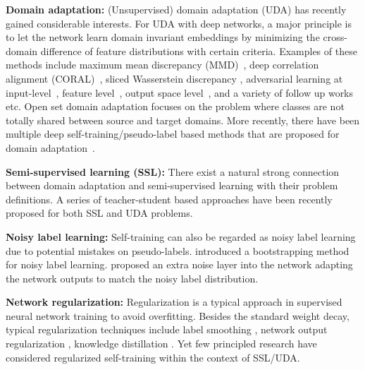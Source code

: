 \documentclass[10pt,twocolumn,letterpaper]{article}
\theoremstyle{plain}
\begin{document}
\noindent\textbf{Domain adaptation: } (Unsupervised) domain adaptation (UDA) has recently gained considerable interests. For UDA with deep networks, a major principle is to let the network learn domain invariant embeddings by minimizing the cross-domain difference of feature distributions with certain criteria. Examples of these methods include maximum mean discrepancy (MMD)~\cite{long2015learning,tzeng2014deep}, deep correlation alignment (CORAL)~\cite{sun2016deep}, sliced Wasserstein discrepancy \cite{lee2019sliced}, adversarial learning at input-level~\cite{hoffman2018cycada,gong2019dlow,dundar2020domain}, feature level~\cite{chen2019learning, ganin2015unsupervised,hoffman2018cycada,liu2019feature,saito2018adversarial,tzeng2017adversarial,wu2018dcan}, output space level~\cite{Tsai_adaptseg_2018}, and a variety of follow up works~\cite{chen2017no,long2018conditional,pinheiro2018unsupervised,sankaranarayanan2018generate} etc. Open set domain adaptation \cite{panareda2017open,saito2018open} focuses on the problem where classes are not totally shared between source and target domains. More recently, there have been multiple deep self-training/pseudo-label based methods that are proposed for domain adaptation~\cite{busto2018open,han2019unsupervised,inoue2018cross,saito2017asymmetric,shu2018dirt,Zou_2018_ECCV}.

\noindent\textbf{Semi-supervised learning (SSL): }There exist a natural strong connection between domain adaptation and semi-supervised learning with their problem definitions. A series of teacher-student based approaches have been recently proposed for both SSL \cite{laine2016temporal, tarvainen2017mean,luo2018smooth} and UDA problems\cite{french2018self}.

\noindent\textbf{Noisy label learning: }
Self-training can also be regarded as noisy label learning \cite{natarajan2013learning,reed2015training,sukhbaatar2014learning,yu2018seal} due to potential mistakes on pseudo-labels. \cite{reed2015training} introduced a bootstrapping method for noisy label learning. \cite{sukhbaatar2014learning} proposed an extra noise layer into the network adapting the network outputs to match the noisy label distribution.

\noindent\textbf{Network regularization: }
Regularization is a typical approach in supervised neural network training to avoid overfitting. Besides the standard weight decay, typical regularization techniques include label smoothing \cite{Goodfellow-et-al-2016,szegedy2016rethinking,liu2019wass}, network output regularization \cite{pereyra2017regularizing}, knowledge distillation \cite{hinton2015distilling}. Yet few principled research have considered regularized self-training within the context of SSL/UDA.
\end{document}
